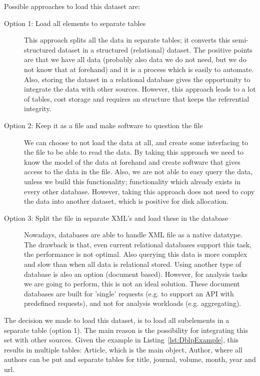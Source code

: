 \documentclass{ou-report}
\begin{document}
Possible approaches to load this dataset are:
\begin{description}
\item[Option 1: Load all elements to separate tables] This approach splits all 
the data in separate tables; it converts this semi-structured dataset in a 
structured (relational) dataset. The positive points are that we have all data 
(probably also data we do not need, but we do not know that at forehand) and it 
is a process which is easily to automate. Also, storing the dataset in a 
relational database gives the opportunity to integrate the data with other 
sources. However, this approach leads to a lot of tables, cost storage and 
requires an structure that keeps the referential integrity.
\item[Option 2: Keep it as a file and make software to question the file] We can 
choose to not load the data at all, and create some interfacing to the file to 
be able to read the data. By taking this approach we need to know the model of 
the data at forehand and create software that gives access to the data in the 
file. Also, we are not able to easy query the data, unless we build this 
functionality; functionality which already exists in every other database. 
However, taking this approach does not need to copy the data into another 
dataset, which is positive for disk allocation.
\item[Option 3: Split the file in separate XML's and load these in the database] 
Nowadays, databases are able to handle XML file as a native datatype. The 
drawback is that, even current relational databases support this task, the 
performance is not optimal. Also querying this data is more complex and slow 
than when all data is relational stored. Using another type of database is also 
an option (document based). However, for analysis tasks we are going to perform, 
this is not an ideal solution. These document databases are built for 'single' 
requests (e.g. to support an API with predefined requests), and not for 
analysis workloads (e.g. aggregating).
\end{description}
The decision we made to load this dataset, is to load all subelements in a 
separate table (option 1). The main reason is the possibility for integrating 
this set with other sources. Given the example in Listing~\ref{lst:DblpExample}, 
this results in multiple tables: Article, which is the main object, Author, 
where all authors can be put and separate tables for title, journal, volume, 
month, year and url.
\end{document}
